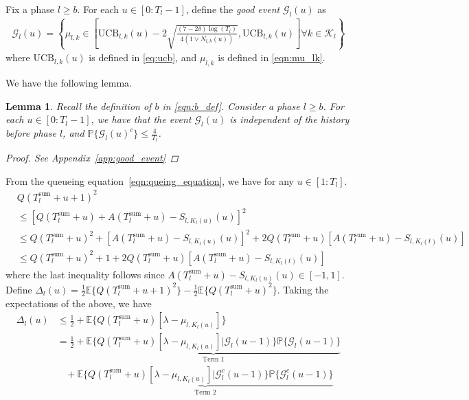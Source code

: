 \documentclass[12pt,draftcls, onecolumn]{IEEEtran}
\newtheorem{lemma}{Lemma}
\begin{document}
Fix a phase $l \geq b$. For each $u \in [0:T_l-1]$, define the \emph{good event} $\mathcal{G}_{l}(u)$ as 
\begin{align}\label{eqn:good_event}
    \mathcal{G}_{l}(u) = \left\{ \mu_{l,k} \in \left[ \text{UCB}_{l,k}(u)- 2\sqrt{\frac{(7-2\delta)\log(T_l)}{4(1 \vee N_{l,k}(u))}},\text{UCB}_{l,k}(u)\right] \forall k \in \mathcal{K}_l\right\}
\end{align}
where $\text{UCB}_{l,k}(u)$ is defined in \eqref{eq:ucb}, and $\mu_{l,k}$ is defined in \eqref{eqn:mu_lk}.

We have the following lemma.
\begin{lemma}\label{lemma:good_event_lemma_app}
   Recall the definition of $b$ in \eqref{eqn:b_def}. Consider a phase $l \geq b$. For each $u \in [0:T_l - 1]$, we have that the event $\mathcal{G}_l(u)$ is independent of the history before phase $l$, and $\mathbb{P}\{\mathcal{G}_l(u)^c\} \leq \frac{4}{T_l}$.
\begin{proof}
See Appendix~\ref{app:good_event}
\end{proof}
\end{lemma}
From the queueing equation~\eqref{eqn:queing_equation}, we have for any $u \in [1:T_l]$. 
\begin{align}
    &Q(T^{\text{sum}}_l+u+1)^2 \nonumber\\&\leq \left[Q(T^{\text{sum}}_l+u) + A(T^{\text{sum}}_l+u) - S_{l,K_l(u)}(u)\right]^2 \nonumber\\& \leq Q(T^{\text{sum}}_l+u)^2 + [A(T^{\text{sum}}_l+u) - S_{l,K_l(u)}(u)]^2   + 2Q(T^{\text{sum}}_l+u)[A(T^{\text{sum}}_l+u)- S_{l,K_l(t)}(u)] \nonumber \\& \leq Q(T^{\text{sum}}_l+u)^2+ 1 + 2Q(T^{\text{sum}}_l+u)[A(T^{\text{sum}}_l+u) -S_{l,K_l(t)}(u)] \nonumber
\end{align}
where the last inequality follows since $A(T^{\text{sum}}_l+u)- S_{l,K_l(u)}(u) \in [-1,1]$. Define $\Delta_l(u) = \frac{1}{2}\mathbb{E}\{Q(T^{\text{sum}}_l+u+1)^2\} - \frac{1}{2}\mathbb{E}\{Q(T^{\text{sum}}_l+u)^2\}$. Taking the expectations of the above, we have
\begin{align}\label{eqn:1919191}
    \Delta_l(u) &\leq 
    \frac{1}{2}+ \mathbb{E}\{Q(T^{\text{sum}}_l+u)[\lambda - \mu_{l,K_l(u)}]\} \nonumber
    \\& =
    \frac{1}{2}+ \underbrace{\mathbb{E}\{Q(T^{\text{sum}}_l+u)[\lambda - \mu_{l,K_l(u)}]|\mathcal{G}_l(u-1)\}\mathbb{P}\{\mathcal{G}_{l}(u-1)\}}_{\text{Term 1}}
    \nonumber\\&\ \ \ \ +\underbrace{\mathbb{E}\{Q(T^{\text{sum}}_l+u)[\lambda - \mu_{l,K_l(u)}]|\mathcal{G}_l^c(u-1)\}\mathbb{P}\{\mathcal{G}_l^c(u-1)\}}_{\text{Term 2}}
\end{align}
\end{document}
